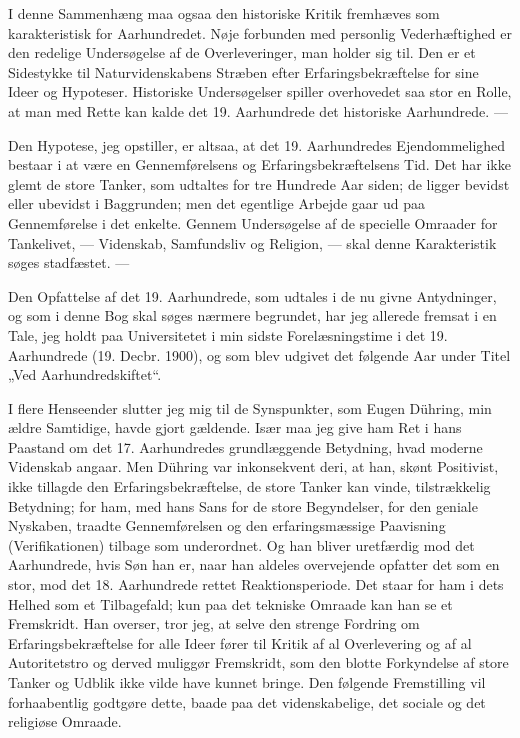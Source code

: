 \documentclass[12pt,a4paper,openany]{book}
\newcommand{\opage}[1]{\marginnote{\footnotesize\textit{[#1]}}}
\begin{document}
I denne Sammenhæng maa ogsaa den historiske Kritik fremhæves
som karakteristisk for Aarhundredet. Nøje forbunden med personlig
Vederhæftighed er den redelige Undersøgelse af de Overleveringer,
man holder sig til. Den er et Sidestykke til Naturvidenskabens Stræben
efter Erfaringsbekræftelse for sine Ideer og Hypoteser. Historiske
Undersøgelser spiller overhovedet saa stor en Rolle, at man med
Rette kan kalde det 19. Aarhundrede det historiske Aarhundrede. ---

Den Hypotese, jeg opstiller, er altsaa, at det 19. Aarhundredes
Ejendommelighed bestaar i at være en Gennemførelsens og Erfaringsbekræftelsens
Tid. Det har ikke glemt de store Tanker, som udtaltes
for tre Hundrede Aar siden; de ligger bevidst eller ubevidst i Baggrunden;
men det egentlige Arbejde gaar ud paa Gennemførelse i
det enkelte. Gennem Undersøgelse af de specielle Omraader for
Tankelivet, --- Videnskab, Samfundsliv og Religion, --- skal denne
Karakteristik søges stadfæstet. ---

Den Opfattelse af det 19. Aarhundrede, som udtales i de nu givne
Antydninger, og som i denne Bog skal søges nærmere begrundet,
har jeg allerede fremsat i en Tale, jeg holdt paa Universitetet i min
sidste Forelæsningstime i det 19. Aarhundrede (19. Decbr. 1900),
og som blev udgivet det følgende Aar under Titel „Ved Aarhundredskiftet“.

I flere Henseender slutter jeg mig til de Synspunkter, som Eugen
\opage{5}Dühring, min ældre Samtidige, havde gjort gældende. Især maa jeg
give ham Ret i hans Paastand om det 17. Aarhundredes grundlæggende
Betydning, hvad moderne Videnskab angaar. Men Dühring
var inkonsekvent deri, at han, skønt Positivist, ikke tillagde den Erfaringsbekræftelse,
de store Tanker kan vinde, tilstrækkelig Betydning;
for ham, med hans Sans for de store Begyndelser, for den
geniale Nyskaben, traadte Gennemførelsen og den erfaringsmæssige
Paavisning (Verifikationen) tilbage som underordnet. Og han bliver
uretfærdig mod det Aarhundrede, hvis Søn han er, naar han aldeles
overvejende opfatter det som en stor, mod det 18. Aarhundrede
rettet Reaktionsperiode. Det staar for ham i dets Helhed som et Tilbagefald;
kun paa det tekniske Omraade kan han se et Fremskridt.
Han overser, tror jeg, at selve den strenge Fordring om Erfaringsbekræftelse
for alle Ideer fører til Kritik af al Overlevering og af al
Autoritetstro og derved muliggør Fremskridt, som den blotte Forkyndelse
af store Tanker og Udblik ikke vilde have kunnet bringe.
Den følgende Fremstilling vil forhaabentlig godtgøre dette, baade
paa det videnskabelige, det sociale og det religiøse Omraade.
\end{document}

